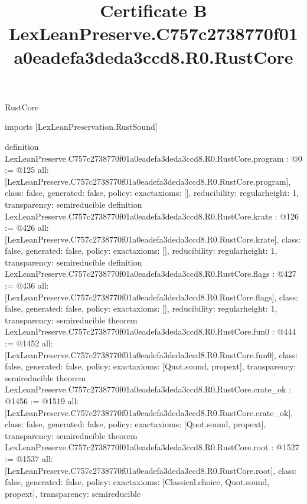 \begin{lexlean}{RustCore}
\title{Certificate B LexLeanPreserve.C757c2738770f01a0eadefa3deda3ccd8.R0.RustCore}
\begin{coremodule}
imports [LexLeanPreservation.RustSound]

definition LexLeanPreserve.C757c2738770f01a0eadefa3deda3ccd8.R0.RustCore.program : @0 := @125 {
  all: [LexLeanPreserve.C757c2738770f01a0eadefa3deda3ccd8.R0.RustCore.program],
  class: false,
  generated: false,
  policy: exact{axioms: []},
  reducibility: regular{height: 1},
  transparency: semireducible
}
definition LexLeanPreserve.C757c2738770f01a0eadefa3deda3ccd8.R0.RustCore.krate : @126 := @426 {
  all: [LexLeanPreserve.C757c2738770f01a0eadefa3deda3ccd8.R0.RustCore.krate],
  class: false,
  generated: false,
  policy: exact{axioms: []},
  reducibility: regular{height: 1},
  transparency: semireducible
}
definition LexLeanPreserve.C757c2738770f01a0eadefa3deda3ccd8.R0.RustCore.flags : @427 := @436 {
  all: [LexLeanPreserve.C757c2738770f01a0eadefa3deda3ccd8.R0.RustCore.flags],
  class: false,
  generated: false,
  policy: exact{axioms: []},
  reducibility: regular{height: 1},
  transparency: semireducible
}
theorem LexLeanPreserve.C757c2738770f01a0eadefa3deda3ccd8.R0.RustCore.fun0 : @444 := @1452 {
  all: [LexLeanPreserve.C757c2738770f01a0eadefa3deda3ccd8.R0.RustCore.fun0],
  class: false,
  generated: false,
  policy: exact{axioms: [Quot.sound, propext]},
  transparency: semireducible
}
theorem LexLeanPreserve.C757c2738770f01a0eadefa3deda3ccd8.R0.RustCore.crate_ok : @1456 := @1519 {
  all: [LexLeanPreserve.C757c2738770f01a0eadefa3deda3ccd8.R0.RustCore.crate_ok],
  class: false,
  generated: false,
  policy: exact{axioms: [Quot.sound, propext]},
  transparency: semireducible
}
theorem LexLeanPreserve.C757c2738770f01a0eadefa3deda3ccd8.R0.RustCore.root : @1527 := @1537 {
  all: [LexLeanPreserve.C757c2738770f01a0eadefa3deda3ccd8.R0.RustCore.root],
  class: false,
  generated: false,
  policy: exact{axioms: [Classical.choice, Quot.sound, propext]},
  transparency: semireducible
}


\end{coremodule}
\end{lexlean}
